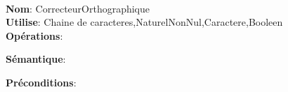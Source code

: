 \documentclass{article}
\begin{document}
    \noindent
    \\
    \textbf{Nom}: CorrecteurOrthographique \\
    \textbf{Utilise}: Chaine de caracteres,NaturelNonNul,Caractere,Booleen \\
    \textbf{Opérations}: \begin{itemize}[label=$\ $, leftmargin=2cm, itemsep=0cm]
    \end{itemize}
    
    \textbf{Sémantique}: \begin{itemize}[label=$\- $, leftmargin=2cm, itemsep=0cm]

    \end{itemize}

    \textbf{Préconditions}: \begin{itemize}[label=$\- $, leftmargin=2cm, itemsep=0cm]

    \end{itemize}
\end{document}
